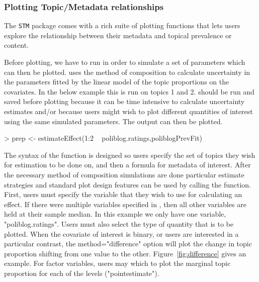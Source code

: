 \documentclass[nojss]{jss}
\begin{document}
\subsubsection{Plotting Topic/Metadata relationships}

The \texttt{STM} package comes with a rich suite of plotting functions that lets users explore the relationship between their metadata and topical prevalence or content.

Before plotting, we have to run  in order to simulate a set of parameters which can then be plotted.   uses the method of composition to calculate uncertainty in the parameters fitted by the linear model of the topic proportions on the covariates.  In the below example this is run on topics 1 and 2.  should be run and saved before plotting because it can be time intensive to calculate uncertainty estimates and/or because users might wish to plot different quantities of interest using the same simulated parameters. The output can then be plotted.

\begin{Schunk}
\begin{Sinput}
> prep <- estimateEffect(1:2 ~ poliblog.ratings,poliblogPrevFit)
\end{Sinput}
\end{Schunk}

The syntax of the  function is designed so users specify the set of topics they wish for estimation to be done on, and then a formula for metadata of interest. After the necessary method of composition simulations are done particular estimate strategies and standard plot design features can be used by calling the  function. First, users must specify the variable that they wish to use for calculating an effect. If there were multiple variables specified in , then all other variables are held at their sample median. In this example we only have one variable, "poliblog.ratings". Users must also select the type of quantity that is to be plotted. When the covariate of interest is binary, or users are interested in a particular contrast, the method="difference" option will plot the change in topic proportion shifting from one value to the other. Figure~\ref{fig:difference} gives an example. For factor variables, users may which to plot the marginal topic proportion for each of the levels ("pointestimate").
\end{document}
